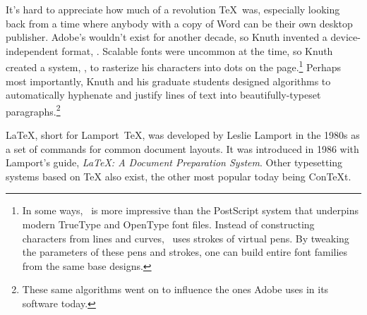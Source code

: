 It's hard to appreciate how much of a revolution \TeX\ was,
especially looking back from a time where anybody with a copy
of Word can be their own desktop publisher.
Adobe's  wouldn't exist for another decade, so Knuth
invented a device-independent format, .
Scalable fonts were uncommon at the time, so Knuth created a system,
\MF, to rasterize his characters into dots on the
page.\punckern\footnote{In some ways,
\MF\ is more impressive than the PostScript system that
underpins modern TrueType and OpenType font files.
Instead of constructing characters from lines and curves,
\MF\ uses strokes of virtual pens.
By tweaking the parameters of these pens and strokes, one can build entire
font families from the same base designs.}
Perhaps most importantly, Knuth and his graduate students designed algorithms
to automatically hyphenate and justify lines of text into
beautifully-typeset paragraphs.\footnote{These same algorithms went
on to influence the ones Adobe uses in its software today.\punckern{}}

\LaTeX{}, short for Lamport~\TeX{}, was developed by Leslie Lamport in the 1980s
as a set of commands for common document layouts.
It was introduced in 1986 with Lamport's guide,
\textit{\LaTeX: A Document Preparation System}.
Other typesetting systems based on \TeX{} also exist,
the other most popular today being Con\TeX{}t.

